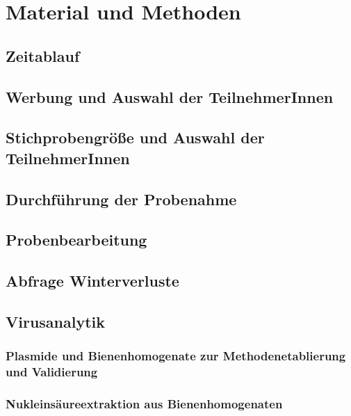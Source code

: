 \section{Material und Methoden}

\subsection{Zeitablauf}

\blindtext

\subsection{Werbung und Auswahl der TeilnehmerInnen}

\blindtext

\subsection{Stichprobengröße und Auswahl der TeilnehmerInnen}

\blindtext

\subsection{Durchführung der Probenahme}

\blindtext

\subsection{Probenbearbeitung}

\blindtext

\subsection{Abfrage Winterverluste}

\blindtext

\subsection{Virusanalytik}

\subsubsection{Plasmide und Bienenhomogenate zur Methodenetablierung und Validierung}

\blindtext

\subsubsection{Nukleinsäureextraktion aus Bienenhomogenaten}

